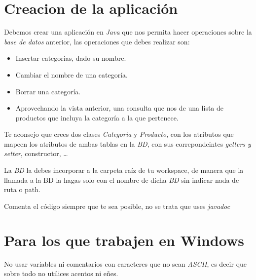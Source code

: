 \documentclass[4paper]{article}
\begin{document}
\section*{Creacion de la aplicación}
Debemos crear una aplicación en \emph{Java} que nos permita hacer operaciones sobre la \emph{base de datos} anterior, las operaciones que debes realizar son:
\begin{itemize}
\item Insertar categorias, dado su nombre.
\item Cambiar el nombre de una categoría.
\item Borrar una categoría.
\item Aprovechando la vista anterior, una consulta que nos de una lista de productos  que incluya la categoría a la que pertenece.
\end{itemize}
Te aconsejo que crees dos clases \emph{Categoria} y \emph{Producto}, con los atributos que mapeen los atributos de ambas tablas en la \emph{BD}, con sus correpondeintes \emph{getters y setter}, constructor, \dots \par 
La \emph{BD} la debes incorporar a la carpeta raíz de tu workspace, de manera que la llamada a la BD la hagas solo con el nombre de dicha \emph{BD} sin indicar nada de ruta o path.
\par 
Comenta el código siempre que te sea posible, no se trata que uses \emph{javadoc}

\section*{Para los que trabajen en Windows}
No usar variables ni comentarios con caracteres que no sean \emph{ASCII}, es decir que sobre todo no utilices acentos ni eñes.
\end{document}
